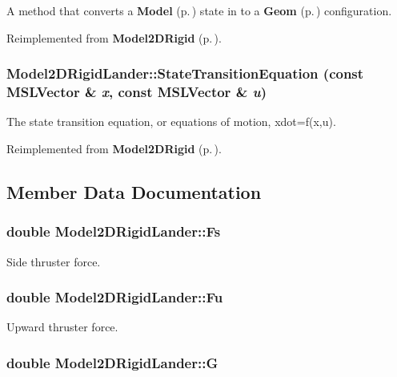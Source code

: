 A method that converts a {\bf Model} {\rm (p.\,\pageref{classModel})} state in to a {\bf Geom} {\rm (p.\,\pageref{classGeom})} configuration.



Reimplemented from {\bf Model2DRigid} {\rm (p.\,\pageref{classModel2DRigid_a7})}.
\subsubsection{ Model2DRigid\-Lander::State\-Transition\-Equation (const {\bf MSLVector} \& {\em x}, const {\bf MSLVector} \& {\em u})\hspace{0.3cm}{\tt  [virtual]}}\label{classModel2DRigidLander_a3}


The state transition equation, or equations of motion, xdot=f(x,u).



Reimplemented from {\bf Model2DRigid} {\rm (p.\,\pageref{classModel2DRigid_a3})}.

\subsection{Member Data Documentation}
\subsubsection{\setlength{\rightskip}{0pt plus 5cm}double Model2DRigid\-Lander::Fs}\label{classModel2DRigidLander_m2}


Side thruster force.

\subsubsection{\setlength{\rightskip}{0pt plus 5cm}double Model2DRigid\-Lander::Fu}\label{classModel2DRigidLander_m3}


Upward thruster force.

\subsubsection{\setlength{\rightskip}{0pt plus 5cm}double Model2DRigid\-Lander::G}\label{classModel2DRigidLander_m1}


